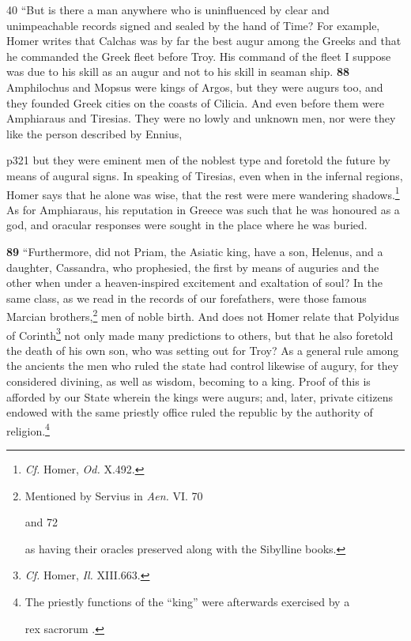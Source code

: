 40
``But is there a man anywhere who is uninfluenced by clear and unimpeachable records signed and sealed by the hand of Time? For example, Homer writes that Calchas was by far the best augur among the Greeks and that he commanded the Greek fleet before Troy. His command of the fleet I suppose was due to his skill as an augur and not to his skill in seaman ­ship. \textbf{88} Amphilochus and Mopsus were kings of Argos, but they were augurs too, and they founded Greek cities on the coasts of Cilicia. And even before them were Amphiaraus and Tiresias. They were no lowly and unknown men, nor were they like the person described by Ennius,

p321
but they were eminent men of the noblest type and foretold the future by means of augural signs. In speaking of Tiresias, even when in the infernal regions, Homer says that he alone was wise, that the rest were mere wandering shadows.\texthebrew{}\footnote{\emph{Cf.} Homer, \emph{Od.} X.492.

} As for Amphiaraus, his reputation in Greece was such that he was honoured as a god, and oracular responses were sought in the place where he was buried.

\textbf{89} ``Furthermore, did not Priam, the Asiatic king, have a son, Helenus, and a daughter, Cassandra, who prophesied, the first by means of auguries and the other when under a heaven-inspired excitement and exaltation of soul? In the same class, as we read in the records of our forefathers, were those famous Marcian brothers,\texthebrew{}\footnote{Mentioned by Servius in \emph{Aen.} VI. 70

and 72

as having their oracles preserved along with the Sibylline books.

} men of noble birth. And does not Homer relate that Polyidus of Corinth\texthebrew{}\footnote{\emph{Cf.} Homer, \emph{Il.} XIII.663.

} not only made many predictions to others, but that he also foretold the death of his own son, who was setting out for Troy? As a general rule among the ancients the men who ruled the state had control likewise of augury, for they considered divining, as well as wisdom, becoming to a king. Proof of this is afforded by our State wherein the kings were augurs; and, later, private citizens endowed with the same priestly office ruled the republic by the authority of religion.\footnote{The priestly functions of the ``king'' were afterwards exercised by a

rex sacrorum .

}

